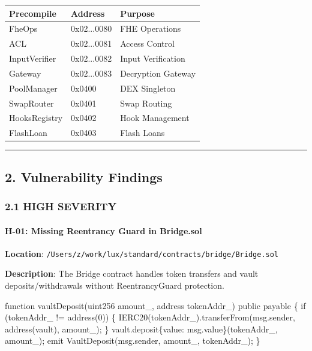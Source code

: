 \documentclass[
]{article}
\newenvironment{Shaded}{}{}
\newcommand{\NormalTok}[1]{#1}
\newcounter{none} %
\begin{document}
{\def\LTcaptype{none} %
\begin{longtable}[]{@{}lll@{}}
\toprule\noalign{}
Precompile & Address & Purpose \\
\midrule\noalign{}
\endhead
\bottomrule\noalign{}
\endlastfoot
FheOps & 0x02...0080 & FHE Operations \\
ACL & 0x02...0081 & Access Control \\
InputVerifier & 0x02...0082 & Input Verification \\
Gateway & 0x02...0083 & Decryption Gateway \\
PoolManager & 0x0400 & DEX Singleton \\
SwapRouter & 0x0401 & Swap Routing \\
HooksRegistry & 0x0402 & Hook Management \\
FlashLoan & 0x0403 & Flash Loans \\
\end{longtable}
}

\begin{center}\rule{0.5\linewidth}{0.5pt}\end{center}

\subsection{2. Vulnerability Findings}\label{2-vulnerability-findings}

\subsubsection{2.1 HIGH SEVERITY}\label{21-high-severity}

\paragraph{H-01: Missing Reentrancy Guard in
Bridge.sol}\label{h-01-missing-reentrancy-guard-in-bridgesol}

\textbf{Location}:
\texttt{/Users/z/work/lux/standard/contracts/bridge/Bridge.sol}

\textbf{Description}: The Bridge contract handles token transfers and
vault deposits/withdrawals without ReentrancyGuard protection.

\begin{Shaded}
\begin{Highlighting}[]
\NormalTok{function vaultDeposit(uint256 amount\_, address tokenAddr\_) public payable \{}
\NormalTok{    if (tokenAddr\_ != address(0)) \{}
\NormalTok{        IERC20(tokenAddr\_).transferFrom(msg.sender, address(vault), amount\_);}
\NormalTok{    \}}
\NormalTok{    vault.deposit\{value: msg.value\}(tokenAddr\_, amount\_);}
\NormalTok{    emit VaultDeposit(msg.sender, amount\_, tokenAddr\_);}
\NormalTok{\}}
\end{Highlighting}
\end{Shaded}
\end{document}
